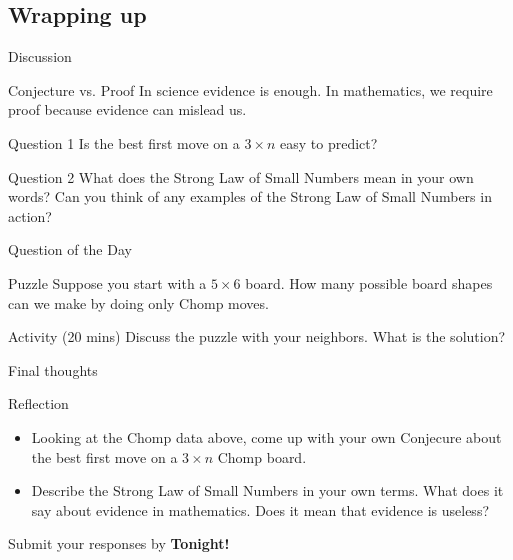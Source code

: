 \documentclass{beamer}
\begin{document}
\subsection{Wrapping up}

\begin{frame}{Discussion}
\pause
  \begin{block}{Conjecture vs. Proof}
    In science evidence is enough.
    In mathematics, we require proof because evidence can mislead us.
  \end{block}
\pause
  \begin{block}{Question 1}
    Is the best first move on a $3\times n$ easy to predict?
  \end{block}
\pause
  \begin{block}{Question 2}
    What does the Strong Law of Small Numbers mean in your own words?
    Can you think of any examples of the Strong Law of Small Numbers in action?
  \end{block}
\end{frame}


\begin{frame}{Question of the Day}
\pause
  \begin{block}{Puzzle}
    Suppose you start with a $5\times 6$ board.
    How many possible board shapes can we make by doing only Chomp moves.
  \end{block}
\pause
  \begin{block}{Activity (20 mins)}
    Discuss the puzzle with your neighbors.  What is the solution?
  \end{block}
\end{frame}

\begin{frame}{Final thoughts}
  \begin{block}{Reflection}
    \begin{itemize}
\pause
      \item Looking at the Chomp data above, come up with your own Conjecure about the best first move on a $3\times n$ Chomp board.
\pause
      \item Describe the Strong Law of Small Numbers in your own terms.  What does it say about evidence in mathematics.  Does it mean that evidence is useless?
    \end{itemize}
  \end{block}
\begin{center}
Submit your responses by \textbf{Tonight!}
\end{center}
\end{frame}
\end{document}
